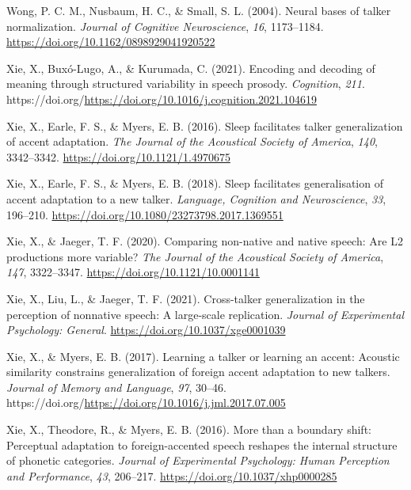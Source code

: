 \documentclass[
  11pt,
  man,floatsintext]{apa6}
\newlength{\cslhangindent}
\newlength{\cslentryspacingunit} %
\newenvironment{CSLReferences}[2] %
 {%
  \setlength{\parindent}{0pt}
  \ifodd #1
  \let\oldpar\par
  \def\par{\hangindent=\cslhangindent\oldpar}
  \fi
  \setlength{\parskip}{#2\cslentryspacingunit}
 }%
 {}
\begin{document}
\begin{CSLReferences}{1}{0}
\leavevmode{}%
Wong, P. C. M., Nusbaum, H. C., \& Small, S. L. (2004). Neural bases of talker normalization. \emph{Journal of Cognitive Neuroscience}, \emph{16}, 1173--1184. \url{https://doi.org/10.1162/0898929041920522}

\leavevmode{}%
Xie, X., Buxó-Lugo, A., \& Kurumada, C. (2021). Encoding and decoding of meaning through structured variability in speech prosody. \emph{Cognition}, \emph{211}. https://doi.org/\url{https://doi.org/10.1016/j.cognition.2021.104619}

\leavevmode{}%
Xie, X., Earle, F. S., \& Myers, E. B. (2016). Sleep facilitates talker generalization of accent adaptation. \emph{The Journal of the Acoustical Society of America}, \emph{140}, 3342--3342. \url{https://doi.org/10.1121/1.4970675}

\leavevmode{}%
Xie, X., Earle, F. S., \& Myers, E. B. (2018). Sleep facilitates generalisation of accent adaptation to a new talker. \emph{Language, Cognition and Neuroscience}, \emph{33}, 196--210. \url{https://doi.org/10.1080/23273798.2017.1369551}

\leavevmode{}%
Xie, X., \& Jaeger, T. F. (2020). Comparing non-native and native speech: Are L2 productions more variable? \emph{The Journal of the Acoustical Society of America}, \emph{147}, 3322--3347. \url{https://doi.org/10.1121/10.0001141}

\leavevmode{}%
Xie, X., Liu, L., \& Jaeger, T. F. (2021). Cross-talker generalization in the perception of nonnative speech: A large-scale replication. \emph{Journal of Experimental Psychology: General}. \url{https://doi.org/10.1037/xge0001039}

\leavevmode{}%
Xie, X., \& Myers, E. B. (2017). Learning a talker or learning an accent: Acoustic similarity constrains generalization of foreign accent adaptation to new talkers. \emph{Journal of Memory and Language}, \emph{97}, 30--46. https://doi.org/\url{https://doi.org/10.1016/j.jml.2017.07.005}

\leavevmode{}%
Xie, X., Theodore, R., \& Myers, E. B. (2016). More than a boundary shift: Perceptual adaptation to foreign-accented speech reshapes the internal structure of phonetic categories. \emph{Journal of Experimental Psychology: Human Perception and Performance}, \emph{43}, 206--217. \url{https://doi.org/10.1037/xhp0000285}


\end{CSLReferences}
\end{document}

